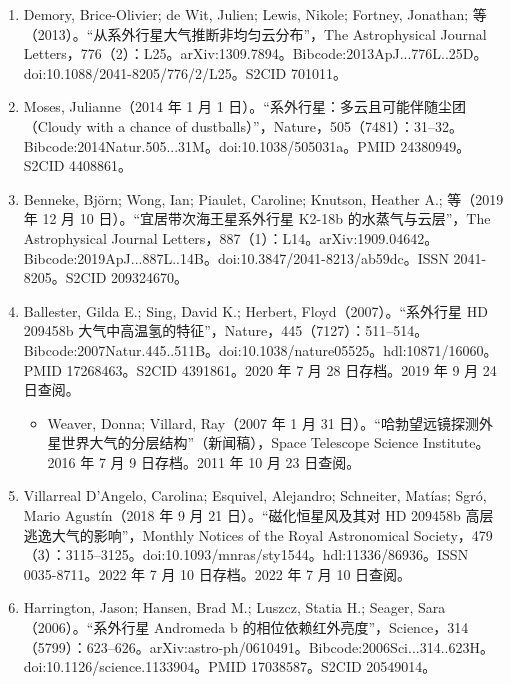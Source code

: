 \begin{enumerate}
\begin{itemize}
\item “首张系外行星地图（First Map of an Extrasolar Planet）”，哈佛–史密森天体物理中心新闻稿，2007 年 5 月 9 日发布。2022 年 12 月 5 日存档。2022 年 7 月 10 日查阅。
\end{itemize}
\item Demory, Brice-Olivier; de Wit, Julien; Lewis, Nikole; Fortney, Jonathan; 等（2013）。“从系外行星大气推断非均匀云分布”，The Astrophysical Journal Letters，776（2）：L25。arXiv:1309.7894。Bibcode:2013ApJ...776L..25D。doi:10.1088/2041-8205/776/2/L25。S2CID 701011。
\item Moses, Julianne（2014 年 1 月 1 日）。“系外行星：多云且可能伴随尘团（Cloudy with a chance of dustballs）”，Nature，505（7481）：31–32。Bibcode:2014Natur.505...31M。doi:10.1038/505031a。PMID 24380949。S2CID 4408861。
\item Benneke, Björn; Wong, Ian; Piaulet, Caroline; Knutson, Heather A.; 等（2019 年 12 月 10 日）。“宜居带次海王星系外行星 K2-18b 的水蒸气与云层”，The Astrophysical Journal Letters，887（1）：L14。arXiv:1909.04642。Bibcode:2019ApJ...887L..14B。doi:10.3847/2041-8213/ab59dc。ISSN 2041-8205。S2CID 209324670。
\item Ballester, Gilda E.; Sing, David K.; Herbert, Floyd（2007）。“系外行星 HD 209458b 大气中高温氢的特征”，Nature，445（7127）：511–514。Bibcode:2007Natur.445..511B。doi:10.1038/nature05525。hdl:10871/16060。PMID 17268463。S2CID 4391861。2020 年 7 月 28 日存档。2019 年 9 月 24 日查阅。
\begin{itemize}
\item Weaver, Donna; Villard, Ray（2007 年 1 月 31 日）。“哈勃望远镜探测外星世界大气的分层结构”（新闻稿），Space Telescope Science Institute。2016 年 7 月 9 日存档。2011 年 10 月 23 日查阅。
\end{itemize}
\item Villarreal D'Angelo, Carolina; Esquivel, Alejandro; Schneiter, Matías; Sgró, Mario Agustín（2018 年 9 月 21 日）。“磁化恒星风及其对 HD 209458b 高层逃逸大气的影响”，Monthly Notices of the Royal Astronomical Society，479（3）：3115–3125。doi:10.1093/mnras/sty1544。hdl:11336/86936。ISSN 0035-8711。2022 年 7 月 10 日存档。2022 年 7 月 10 日查阅。
\item Harrington, Jason; Hansen, Brad M.; Luszcz, Statia H.; Seager, Sara（2006）。“系外行星 Andromeda b 的相位依赖红外亮度”，Science，314（5799）：623–626。arXiv:astro-ph/0610491。Bibcode:2006Sci...314..623H。doi:10.1126/science.1133904。PMID 17038587。S2CID 20549014。

\end{enumerate}
